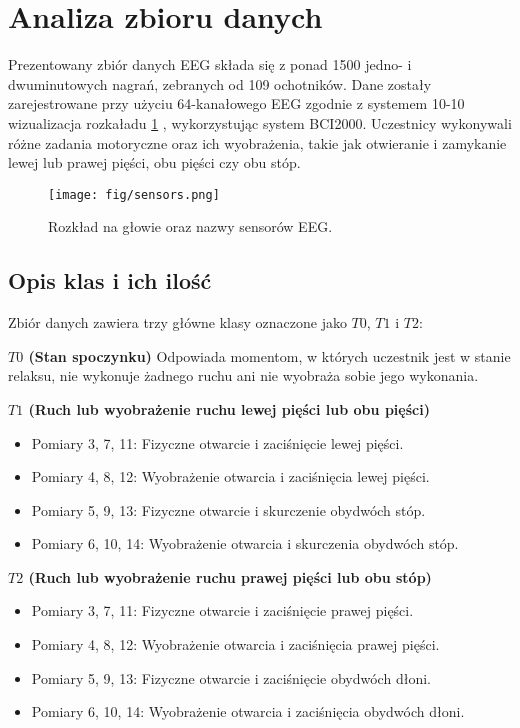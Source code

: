 \documentclass[eeg_v4.tex]{subfiles}
\begin{document}
    \section{Analiza zbioru danych}

    Prezentowany zbiór danych EEG składa się z ponad 1500 jedno- i dwuminutowych nagrań, zebranych od 109 ochotników.
    Dane zostały zarejestrowane przy użyciu 64-kanałowego EEG zgodnie z systemem 10-10 wizualizacja rozkaładu \ref{fig:sensors} , wykorzystując system BCI2000.
    Uczestnicy wykonywali różne zadania motoryczne oraz ich wyobrażenia, takie jak otwieranie i zamykanie lewej lub
    prawej pięści, obu pięści czy obu stóp.

    \begin{figure}[h!]
        \centering
        \texttt{[image: fig/sensors.png]}
        \caption{Rozkład na głowie oraz nazwy sensorów EEG.}
        \label{fig:sensors}
    \end{figure}

    \subsection{Opis klas i ich ilość}

    Zbiór danych zawiera trzy główne klasy oznaczone jako $T0$, $T1$ i $T2$:

    \textbf{$T0$ (Stan spoczynku)}
    Odpowiada momentom, w których uczestnik jest w stanie relaksu, nie wykonuje żadnego ruchu ani nie wyobraża sobie
    jego wykonania.

    \textbf{$T1$ (Ruch lub wyobrażenie ruchu lewej pięści lub obu pięści)}
    \begin{itemize}
        \item Pomiary 3, 7, 11: Fizyczne otwarcie i zaciśnięcie lewej pięści.
        \item Pomiary 4, 8, 12: Wyobrażenie otwarcia i zaciśnięcia lewej pięści.
        \item Pomiary 5, 9, 13: Fizyczne otwarcie i skurczenie obydwóch stóp.
        \item Pomiary 6, 10, 14: Wyobrażenie otwarcia i skurczenia obydwóch stóp.
    \end{itemize}

    \textbf{$T2$ (Ruch lub wyobrażenie ruchu prawej pięści lub obu stóp)}
    \begin{itemize}
        \item Pomiary 3, 7, 11: Fizyczne otwarcie i zaciśnięcie prawej pięści.
        \item Pomiary 4, 8, 12: Wyobrażenie otwarcia i zaciśnięcia prawej pięści.
        \item Pomiary 5, 9, 13: Fizyczne otwarcie i zaciśnięcie obydwóch dłoni.
        \item Pomiary 6, 10, 14: Wyobrażenie otwarcia i zaciśnięcia obydwóch dłoni.
    \end{itemize}
\end{document}
